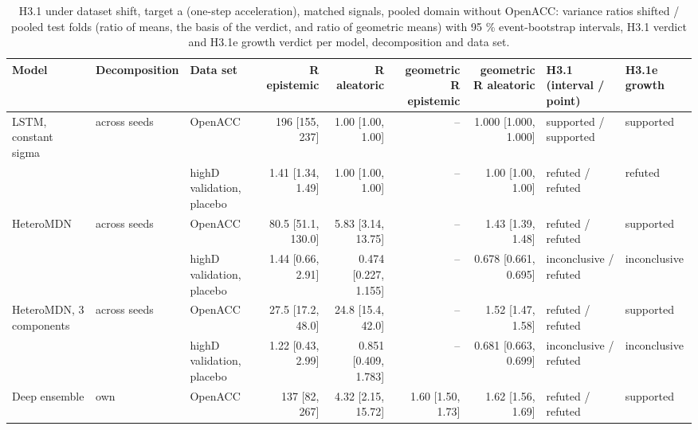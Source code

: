 \begin{table}[htbp]
\centering
\footnotesize
\caption{H3.1 under dataset shift, target a (one-step acceleration), matched signals, pooled domain without OpenACC: variance ratios shifted / pooled test folds (ratio of means, the basis of the verdict, and ratio of geometric means) with 95 \% event-bootstrap intervals, H3.1 verdict and H3.1e growth verdict per model, decomposition and data set.}
\label{tab:t2-h31--lodo-openacc--a}
\begin{tabular}{lllrrrrll}
\toprule
Model & Decomposition & Data set & R epistemic & R aleatoric & geometric R epistemic & geometric R aleatoric & H3.1 (interval / point) & H3.1e growth \\
\midrule
LSTM, constant sigma & across seeds & OpenACC & 196 [155, 237] & 1.00 [1.00, 1.00] & -- & 1.000 [1.000, 1.000] & supported / supported & supported \\
 &  & highD validation, placebo & 1.41 [1.34, 1.49] & 1.00 [1.00, 1.00] & -- & 1.00 [1.00, 1.00] & refuted / refuted & refuted \\
\midrule
HeteroMDN & across seeds & OpenACC & 80.5 [51.1, 130.0] & 5.83 [3.14, 13.75] & -- & 1.43 [1.39, 1.48] & refuted / refuted & supported \\
 &  & highD validation, placebo & 1.44 [0.66, 2.91] & 0.474 [0.227, 1.155] & -- & 0.678 [0.661, 0.695] & inconclusive / refuted & inconclusive \\
\midrule
HeteroMDN, 3 components & across seeds & OpenACC & 27.5 [17.2, 48.0] & 24.8 [15.4, 42.0] & -- & 1.52 [1.47, 1.58] & refuted / refuted & supported \\
 &  & highD validation, placebo & 1.22 [0.43, 2.99] & 0.851 [0.409, 1.783] & -- & 0.681 [0.663, 0.699] & inconclusive / refuted & inconclusive \\
\midrule
Deep ensemble & own & OpenACC & 137 [82, 267] & 4.32 [2.15, 15.72] & 1.60 [1.50, 1.73] & 1.62 [1.56, 1.69] & refuted / refuted & supported \\

\end{tabular}
\end{table}
